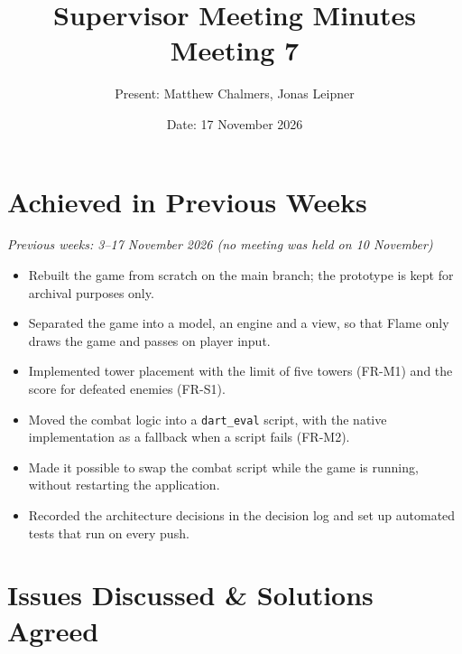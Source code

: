 \documentclass[12pt,a4paper]{article}
\title{\textbf{Supervisor Meeting Minutes}\\Meeting 7}
\author{Present: Matthew Chalmers, Jonas Leipner}
\date{Date: 17 November 2026}
\begin{document}
\maketitle

\section{Achieved in Previous Weeks}

\noindent\textit{Previous weeks: 3--17 November 2026 (no meeting was held on
10 November)}

\begin{itemize}[leftmargin=*]
    \item Rebuilt the game from scratch on the main branch; the prototype is
    kept for archival purposes only.
    \item Separated the game into a model, an engine and a view, so that Flame
    only draws the game and passes on player input.
    \item Implemented tower placement with the limit of five towers (FR-M1)
    and the score for defeated enemies (FR-S1).
    \item Moved the combat logic into a \texttt{dart\_eval} script, with the
    native implementation as a fallback when a script fails (FR-M2).
    \item Made it possible to swap the combat script while the game is
    running, without restarting the application.
    \item Recorded the architecture decisions in the decision log and set up
    automated tests that run on every push.
\end{itemize}

\section{Issues Discussed \& Solutions Agreed}
\end{document}
